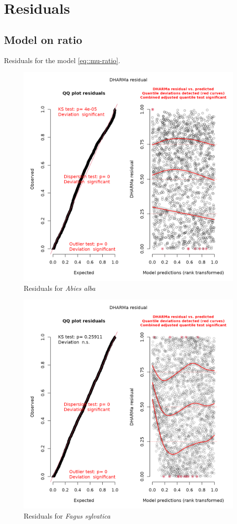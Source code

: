 \chapter{Residuals\label{app::residuals}}

\section{Model on ratio}
Residuals for the model \eqref{eq::mu-ratio}.

\begin{figure}[h]
	\includegraphics[scale = 0.5]{./Figures/abiesAlba-res.png}
	\caption{Residuals for \textit{Abies alba}}
\end{figure}

\begin{figure}
	\includegraphics[scale = 0.5]{./Figures/fagSyl-res.png}
	\caption{Residuals for \textit{Fagus sylvatica}}
\end{figure}
